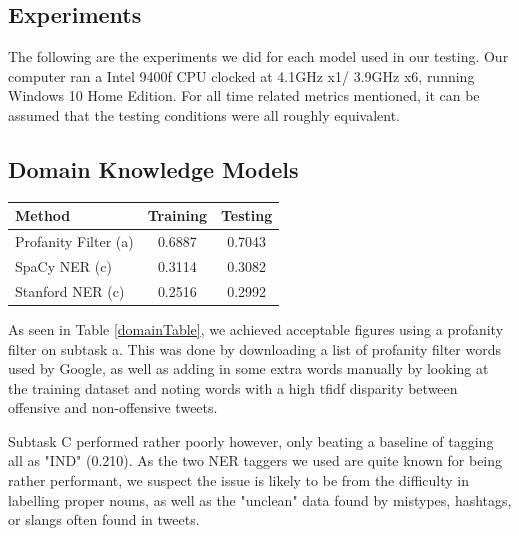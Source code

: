 \documentclass[a4paper, 12pt]{article}
\begin{document}
\begin{multicols}{2}
    \section{Experiments}
        The following are the experiments we did for each model used in our testing. Our computer ran a Intel 9400f CPU clocked at 4.1GHz x1/ 3.9GHz x6, running Windows 10 Home Edition. For all time related metrics mentioned, it can be assumed that the testing conditions were all roughly equivalent.
    \subsection{Domain Knowledge Models}
        \begin{center}
            \begin{tabular}{l|cc}
                Method & Training & Testing \\
                \hline
                Profanity Filter (a) & 0.6887 & 0.7043 \\
                SpaCy NER (c) & 0.3114 & 0.3082 \\
                Stanford NER (c) & 0.2516 & 0.2992 \\
            \end{tabular}       
            \label{domainTable}
        \end{center}

        As seen in Table \ref{domainTable}, we achieved acceptable figures using a profanity filter on subtask a. This was done by downloading a list of profanity filter words used by Google, as well as adding in some extra words manually by looking at the training dataset and noting words with a high tfidf disparity between offensive and non-offensive tweets. 
        
        Subtask C performed rather poorly however, only beating a baseline of tagging all as "IND" (0.210). As the two NER taggers we used are quite known for being rather performant, we suspect the issue is likely to be from the difficulty in labelling proper nouns, as well as the "unclean" data found by mistypes, hashtags, or slangs often found in tweets.

\end{multicols}
\end{document}
